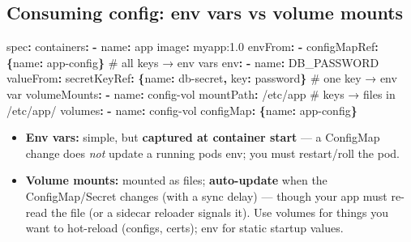 \documentclass[11pt]{article}
\providecommand{\tightlist}{\setlength{\itemsep}{1pt}\setlength{\parskip}{0pt}}
\newenvironment{Shaded}{\begin{snugshade}}{\end{snugshade}}
\newcommand{\AttributeTok}[1]{\textcolor[rgb]{0.16,0.50,0.73}{#1}}
\newcommand{\CommentTok}[1]{\textcolor[rgb]{0.48,0.49,0.49}{#1}}
\newcommand{\FunctionTok}[1]{\textcolor[rgb]{0.56,0.27,0.68}{#1}}
\newcommand{\KeywordTok}[1]{\textcolor[rgb]{0.81,0.81,0.76}{\textbf{#1}}}
\begin{document}
\subsection{Consuming config: env vars vs volume mounts}\label{consuming-config-env-vars-vs-volume-mounts}


\begin{Shaded}
\begin{Highlighting}[]
\FunctionTok{spec}\KeywordTok{:}
\AttributeTok{  }\FunctionTok{containers}\KeywordTok{:}
\AttributeTok{    }\KeywordTok{{-}}\AttributeTok{ }\FunctionTok{name}\KeywordTok{:}\AttributeTok{ app}
\AttributeTok{      }\FunctionTok{image}\KeywordTok{:}\AttributeTok{ myapp:1.0}
\AttributeTok{      }\FunctionTok{envFrom}\KeywordTok{:}
\AttributeTok{        }\KeywordTok{{-}}\AttributeTok{ }\FunctionTok{configMapRef}\KeywordTok{:}\AttributeTok{ }\KeywordTok{\{}\FunctionTok{name}\KeywordTok{:}\AttributeTok{ app{-}config}\KeywordTok{\}}\CommentTok{    \# all keys → env vars}
\AttributeTok{      }\FunctionTok{env}\KeywordTok{:}
\AttributeTok{        }\KeywordTok{{-}}\AttributeTok{ }\FunctionTok{name}\KeywordTok{:}\AttributeTok{ DB\_PASSWORD}
\AttributeTok{          }\FunctionTok{valueFrom}\KeywordTok{:}
\AttributeTok{            }\FunctionTok{secretKeyRef}\KeywordTok{:}\AttributeTok{ }\KeywordTok{\{}\FunctionTok{name}\KeywordTok{:}\AttributeTok{ db{-}secret}\KeywordTok{,}\AttributeTok{ }\FunctionTok{key}\KeywordTok{:}\AttributeTok{ password}\KeywordTok{\}}\CommentTok{   \# one key → env var}
\AttributeTok{      }\FunctionTok{volumeMounts}\KeywordTok{:}
\AttributeTok{        }\KeywordTok{{-}}\AttributeTok{ }\FunctionTok{name}\KeywordTok{:}\AttributeTok{ config{-}vol}
\AttributeTok{          }\FunctionTok{mountPath}\KeywordTok{:}\AttributeTok{ /etc/app}\CommentTok{                  \# keys → files in /etc/app/}
\AttributeTok{  }\FunctionTok{volumes}\KeywordTok{:}
\AttributeTok{    }\KeywordTok{{-}}\AttributeTok{ }\FunctionTok{name}\KeywordTok{:}\AttributeTok{ config{-}vol}
\AttributeTok{      }\FunctionTok{configMap}\KeywordTok{:}\AttributeTok{ }\KeywordTok{\{}\FunctionTok{name}\KeywordTok{:}\AttributeTok{ app{-}config}\KeywordTok{\}}
\end{Highlighting}
\end{Shaded}

\begin{itemize}
\tightlist
\item
  \textbf{Env vars:} simple, but \textbf{captured at container start} --- a ConfigMap change does \emph{not} update a running pod\textquotesingle s env; you must restart/roll the pod.
\item
  \textbf{Volume mounts:} mounted as files; \textbf{auto-update} when the ConfigMap/Secret changes (with a sync delay) --- though your app must re-read the file (or a sidecar reloader signals it). Use volumes for things you want to hot-reload (configs, certs); env for static startup values.
\end{itemize}
\end{document}
